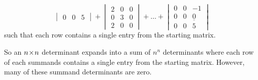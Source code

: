 \begin{example}
\begin{equation*}
\begin{vmatrix}
     0  &0  &5
  \end{vmatrix}
  +
  \begin{vmatrix}
     2  &0  &0   \\
     0  &3  &0   \\
     2  &0  &0
  \end{vmatrix}
  +\dots+
  \begin{vmatrix}
     0  &0  &-1  \\
     0  &0  &\underline{0}  \\
     0  &0  &5
  \end{vmatrix}
\end{equation*}
such that each row contains a single entry from the starting matrix.
\end{example}

So an \( n \! \times \! n \) determinant expands into a
sum of \( n^n \) determinants where
each row of each summands contains a single entry from the
starting matrix.
However, many of these summand determinants are zero.

